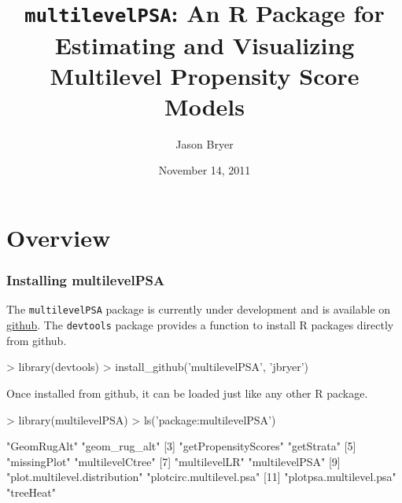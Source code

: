 \documentclass[10pt,slidestop,mathserif]{beamer}
\title[MultilevelPSA]{\texttt{multilevelPSA}: An R Package for Estimating and Visualizing Multilevel Propensity Score Models}
\subtitle{}
\author[Bryer]{Jason Bryer}
\institute[University at Albany]{University at Albany}
\date{November 14, 2011}
\begin{document}
\frame{\titlepage}

\section{Overview}

\begin{frame}
	\frametitle{Installing multilevelPSA}
	The \texttt{multilevelPSA} package is currently under development and is available on \href{http://github.com}{github}. The \texttt{devtools} package provides a function to install R packages directly from github.
\begin{Schunk}
\begin{Sinput}
> library(devtools)
> install_github('multilevelPSA', 'jbryer')
\end{Sinput}
\end{Schunk}
\pause
Once installed from github, it can be loaded just like any other R package.
\begin{Schunk}
\begin{Sinput}
> library(multilevelPSA)
> ls('package:multilevelPSA')
\end{Sinput}
\begin{Soutput}
 [1] "GeomRugAlt"                   "geom_rug_alt"                
 [3] "getPropensityScores"          "getStrata"                   
 [5] "missingPlot"                  "multilevelCtree"             
 [7] "multilevelLR"                 "multilevelPSA"               
 [9] "plot.multilevel.distribution" "plotcirc.multilevel.psa"     
[11] "plotpsa.multilevel.psa"       "treeHeat"                    
\end{Soutput}
\end{Schunk}
\end{frame}
\end{document}
